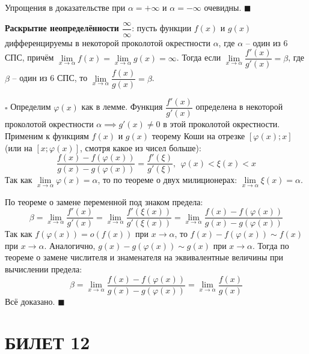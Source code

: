 \documentclass[12pt, a4paper, reqno]{article}
\begin{document}
    Упрощения в доказательстве при $\alpha = +\infty$ и $\alpha = -\infty$ очевидны. $\blacksquare$

    \textbf{Раскрытие неопределённости $\dfrac{\infty}{\infty}$}: пусть функции $f(x)$ и $g(x)$
    дифференцируемы в некоторой проколотой окрестности $\alpha$, где $\alpha$ -- один из 6 СПС,
    причём $\lim\limits_{x\to\alpha} f(x) = \lim\limits_{x\to\alpha} g(x) = \infty$. Тогда если
    $\lim\limits_{x\to\alpha} \dfrac{f'(x)}{g'(x)} = \beta$, где $\beta$ -- один из 6 СПС, то
    $\lim\limits_{x\to\alpha} \dfrac{f(x)}{g(x)} = \beta$.

    $\square$ Определим $\varphi(x)$ как в лемме.
    Функция $\dfrac{f'(x)}{g'(x)}$ определена в некоторой проколотой окрестности $\alpha
    \implies g'(x)\neq 0$ в этой проколотой окрестности. Применим к функциям $f(x)$ и $g(x)$ теорему
    Коши на отрезке $[\varphi(x); x]$ (или на $[x; \varphi(x)]$, смотря какое из чисел больше):
    \begin{equation*}
        \dfrac{f(x) - f(\varphi(x))}{g(x) - g(\varphi(x))} =
        \dfrac{f'(\xi)}{g'(\xi)},\>\>\varphi(x) < \xi(x) < x
    \end{equation*}
    Так как $\lim\limits_{x\to\alpha}\varphi(x) = \alpha$, то по теореме о двух милиционерах:
    $\lim\limits_{x\to\alpha}\xi(x) = \alpha$.

    По теореме о замене переменной под знаком предела:
    \begin{equation*}
        \beta =
        \lim\limits_{x\to\alpha}\dfrac{f'(x)}{g'(x)} =
        \lim\limits_{x\to\alpha}\dfrac{f'(\xi(x))}{g'(\xi(x))} =
        \lim\limits_{x\to\alpha} \dfrac{f(x) - f(\varphi(x))}{g(x) - g(\varphi(x))}
    \end{equation*}
    Так как $f(\varphi(x)) = o(f(x))$ при $x\to\alpha$, то $f(x) - f(\varphi(x)) \sim f(x)$ при
    $x\to\alpha$. Аналогично, $g(x) - g(\varphi(x)) \sim g(x)$ при $x\to\alpha$. Тогда по теореме о
    замене числителя и знаменателя на эквивалентные величины при вычислении предела:
    \begin{equation*}
        \beta =
        \lim\limits_{x\to\alpha} \dfrac{f(x) - f(\varphi(x))}{g(x) - g(\varphi(x))} =
        \lim\limits_{x\to\alpha} \dfrac{f(x)}{g(x)}
    \end{equation*}
    Всё доказано. $\blacksquare$

\newpage
\section{БИЛЕТ 12}
\end{document}
